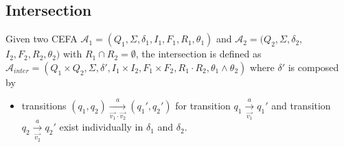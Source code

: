 \documentclass[runningheads]{llncs}
\newcommand*{\myvec}[1]{\vec{#1}}
\newcommand*{\aut}{\mathcal{A}}
\begin{document}
\subsection{Intersection}\label{subsec:inter}
Given two CEFA $\aut_1 = (Q_1, \Sigma, \delta_1, I_1, F_1, R_1, \theta_1)$ and $\aut_2 = (Q_2, \Sigma, \delta_2,$ $I_2, F_2, R_2, \theta_2)$ with $R_1\cap R_2 = \emptyset$, the intersection is defined as $\aut_{inter} = (Q_1\times Q_2, \Sigma, \delta', I_1\times I_2, F_1\times F_2, R_1\cdot R_2, \theta_1\wedge \theta_2)$ where $\delta'$ is composed by
\begin{itemize}
  \item transitions $(q_1,q_2)\xrightarrow[\myvec{v_1}\cdot\myvec{v_2}]{a} (q_1',q_2')$ for  transition $q_1\xrightarrow[\myvec{v_1}]{a}q_1'$ and transition $q_2\xrightarrow[\myvec{v_2}]{a}q_2'$ exist individually in  $\delta_1$ and $\delta_2$.
\end{itemize}
\end{document}

